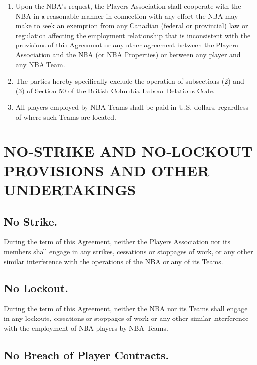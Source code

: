 \documentclass[
]{book}
\begin{document}
\begin{enumerate}
\item
  Upon the NBA's request, the Players Association shall cooperate with the NBA in a reasonable manner in connection with any effort the NBA may make to seek an exemption from any Canadian (federal or provincial) law or regulation affecting the employment relationship that is inconsistent with the provisions of this Agreement or any other agreement between the Players Association and the NBA (or NBA Properties) or between any player and any NBA Team.
\item
  The parties hereby specifically exclude the operation of subsections (2) and (3) of Section 50 of the British Columbia Labour Relations Code.
\item
  All players employed by NBA Teams shall be paid in U.S. dollars, regardless of where such Teams are located.
\end{enumerate}

\hypertarget{no-strike-and-no-lockout-provisions-and-other-undertakings}{%
\chapter{NO-STRIKE AND NO-LOCKOUT PROVISIONS AND OTHER UNDERTAKINGS}\label{no-strike-and-no-lockout-provisions-and-other-undertakings}}


\hypertarget{no-strike.}{%
\section{No Strike.}\label{no-strike.}}

During the term of this Agreement, neither the Players Association nor its members shall engage in any strikes, cessations or stoppages of work, or any other similar interference with the operations of the NBA or any of its Teams.

\hypertarget{no-lockout.}{%
\section{No Lockout.}\label{no-lockout.}}

During the term of this Agreement, neither the NBA nor its Teams shall engage in any lockouts, cessations or stoppages of work or any other similar interference with the employment of NBA players by NBA Teams.

\hypertarget{no-breach-of-player-contracts.}{%
\section{No Breach of Player Contracts.}\label{no-breach-of-player-contracts.}}
\end{document}
